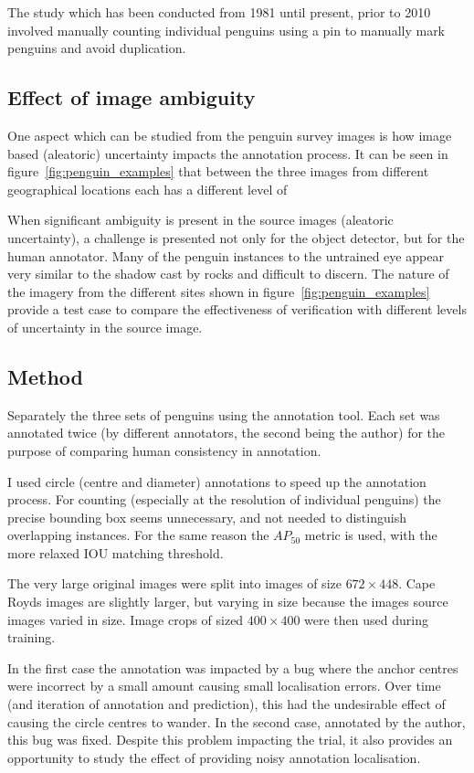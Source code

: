 The study which has been conducted from 1981 until present, prior to 2010 involved manually counting individual penguins using a pin to manually mark penguins and avoid duplication. 


\subsection {Effect of image ambiguity}

One aspect which can be studied from the penguin survey images is how image based (aleatoric) uncertainty impacts the annotation process. It can be seen in figure~\ref{fig:penguin_examples} that between the three images from different geographical locations each has a different level of 

When significant ambiguity is present in the source images (aleatoric uncertainty), a challenge is presented not only for the object detector, but for the human annotator. Many of the penguin instances to the untrained eye appear very similar to the shadow cast by rocks and difficult to discern. The nature of the imagery from the different sites shown in figure~\ref{fig:penguin_examples} provide a test case to compare the effectiveness of verification with different levels of uncertainty in the source image. 

\subsection {Method}

Separately the three sets of penguins using the annotation tool. Each set was annotated twice (by different annotators, the second being the author) for the purpose  of comparing human consistency in annotation.

I used circle (centre and diameter) annotations to speed up the annotation process. For counting (especially at the resolution of individual penguins) the precise bounding box seems unnecessary, and not needed to distinguish overlapping instances. For the same reason the $AP_{50}$ metric is used, with the more relaxed \gls{IOU} matching threshold.

The very large original images were split into images of size $ 672\times448 $. Cape Royds images are slightly larger, but varying in size because the images source images varied in size. Image crops of sized $ 400\times400 $ were then used during training.

In the first case the annotation was impacted by a bug where the anchor centres were incorrect by a small amount causing small localisation errors. Over time (and iteration of annotation and prediction), this had the undesirable effect of causing the circle centres to wander. In the second case, annotated by the author, this bug was fixed. Despite this problem impacting the trial, it also provides an opportunity to study the effect of providing noisy annotation localisation.



